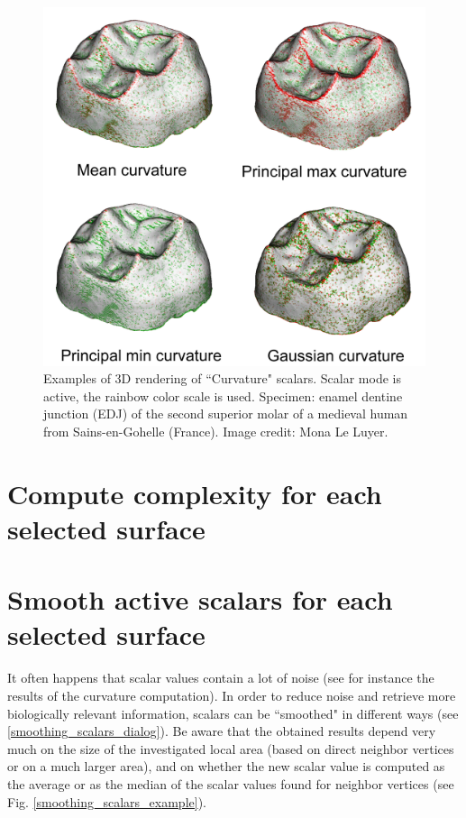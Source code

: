 \begin{figure}
  \centering
  \includegraphics[scale=0.3]{images/11/curvature_example.png} 
	\caption{
Examples of 3D rendering of ``Curvature" scalars. Scalar mode is active, the rainbow color scale is used. Specimen: enamel dentine junction (EDJ) of the second superior molar of a medieval human from Sains-en-Gohelle (France). Image credit: Mona Le Luyer.}
\label{curvatures}
 
\end{figure}

\section{Compute complexity for each selected surface}


\section{Smooth active scalars for each selected surface}
It often happens that scalar values contain a lot of noise (see for instance the results of the curvature computation). In order to reduce noise and retrieve more biologically relevant information, scalars can be ``smoothed" in different ways (see \ref{smoothing_scalars_dialog}). Be aware that the obtained results depend very much on the size of the investigated local area (based on direct neighbor vertices or on a much larger area), and on whether the new scalar value is computed as the average or as the median of the scalar values found for neighbor vertices (see Fig. \ref{smoothing_scalars_example}).

